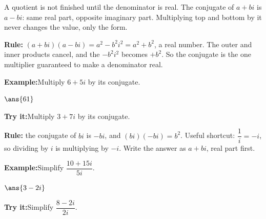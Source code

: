 \documentclass[12pt]{article}
\begin{document}

\noindent\small A quotient is not finished until the denominator is real.
The conjugate of $a + bi$ is $a - bi$: same real part, opposite imaginary
part. Multiplying top and bottom by it never changes the value, only the form.
\normalsize

\begin{formulabox}
\textbf{Rule:} $(a+bi)(a-bi) = a^2 - b^2i^2 = a^2 + b^2$, a real number.
The outer and inner products cancel, and the $-b^2i^2$ becomes $+b^2$.
So the conjugate is the one multiplier guaranteed to make a denominator real.
\end{formulabox}
\begin{examplebox}
\textbf{Example:}\quad Multiply $6 + 5i$ by its conjugate.
\par
$\ans{61}$
\end{examplebox}
\begin{tryitbox}
\textbf{Try it:}\quad Multiply $3 + 7i$ by its conjugate.\\[2pt]
\end{tryitbox}

\begin{formulabox}
\textbf{Rule:} the conjugate of $bi$ is $-bi$, and $(bi)(-bi) = b^2$.
Useful shortcut: $\dfrac{1}{i} = -i$, so dividing by $i$ is multiplying by
$-i$. Write the answer as $a + bi$, real part first.
\end{formulabox}
\begin{examplebox}
\textbf{Example:}\quad Simplify $\dfrac{10 + 15i}{5i}$.
\par
$\ans{3-2i}$
\end{examplebox}
\begin{tryitbox}
\textbf{Try it:}\quad Simplify $\dfrac{8 - 2i}{2i}$.\\[2pt]
\end{tryitbox}
\end{document}
